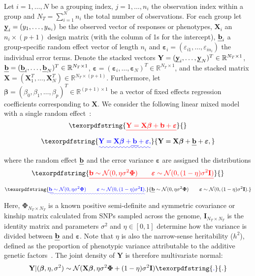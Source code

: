 \documentclass[10pt,letterpaper]{article}
\newcommand{\by}{\textbf{\emph{y}}}
\newcommand{\bX}{\textbf{X}}
\newcommand{\bY}{\textbf{Y}}
\newcommand{\bb}{\textbf{\emph{b}}}
\newcommand{\bI}{\textbf{I}}
\newcommand{\be}{\boldsymbol{\varepsilon}}
\newcommand{\bbeta}{\boldsymbol{\beta}}
\newcommand{\bPhi}{\boldsymbol{\Phi}}
\providecommand{\DIFaddtex}[1]{{\protect\color{blue}\uwave{#1}}} %
\providecommand{\DIFdeltex}[1]{{\protect\color{red}\sout{#1}}}                      %
\providecommand{\DIFaddbegin}{} %
\providecommand{\DIFaddend}{} %
\providecommand{\DIFdelbegin}{} %
\providecommand{\DIFdelend}{} %
\providecommand{\DIFadd}[1]{\texorpdfstring{\DIFaddtex{#1}}{#1}} %
\providecommand{\DIFdel}[1]{\texorpdfstring{\DIFdeltex{#1}}{}} %
\newcommand{\DIFscaledelfig}{0.5}
\newlength{\DIFdelgraphicswidth} %
\newlength{\DIFdelgraphicsheight} %
\newcommand{\DIFaddincludegraphics}[2][]{{\color{blue}\fbox{\DIFOincludegraphics[#1]{#2}}}} %
\newcommand{\DIFdelincludegraphics}[2][]{%
\sbox{\DIFdelgraphicsbox}{\DIFOincludegraphics[#1]{#2}}%
\settoboxwidth{\DIFdelgraphicswidth}{\DIFdelgraphicsbox} %
\settoboxtotalheight{\DIFdelgraphicsheight}{\DIFdelgraphicsbox} %
\scalebox{\DIFscaledelfig}{%
\parbox[b]{\DIFdelgraphicswidth}{\usebox{\DIFdelgraphicsbox}\\[-\baselineskip] \rule{\DIFdelgraphicswidth}{0em}}\llap{\resizebox{\DIFdelgraphicswidth}{\DIFdelgraphicsheight}{%
\setlength{\unitlength}{\DIFdelgraphicswidth}%
\begin{picture}(1,1)%
\thicklines\linethickness{2pt} %
{\color[rgb]{1,0,0}\put(0,0){\framebox(1,1){}}}%
{\color[rgb]{1,0,0}\put(0,0){\line( 1,1){1}}}%
{\color[rgb]{1,0,0}\put(0,1){\line(1,-1){1}}}%
\end{picture}%
}\hspace*{3pt}}} %
} %
\DeclareRobustCommand{\DIFaddbegin}{\DIFOaddbegin \let\includegraphics\DIFaddincludegraphics} %
\DeclareRobustCommand{\DIFaddend}{\DIFOaddend \let\includegraphics\DIFOincludegraphics} %
\DeclareRobustCommand{\DIFdelbegin}{\DIFOdelbegin \let\includegraphics\DIFdelincludegraphics} %
\DeclareRobustCommand{\DIFdelend}{\DIFOaddend \let\includegraphics\DIFOincludegraphics} %
\begin{document}
Let $i = 1, \ldots, N$ be a grouping index, $j = 1, \ldots, n_i$ the observation index within a group and $N_T = \sum_{i=1}^{N} n_i$ the total number of observations. For each group let \mbox{$\by_i = (y_1, \ldots, y_{n_i})$} be the observed vector of responses or phenotypes, $\bX_i$ an $n_i \times (p + 1)$ design matrix (with the column of 1s for the intercept), $\bb_i$ a group-specific random effect vector of length $n_i$ and \mbox{$\be_i = (\varepsilon_{i1}, \ldots, \varepsilon_{in_i})$} the individual error terms. Denote the stacked vectors $\bY = (\by_i, \ldots, \by_N)^T \in \mathbb{R}^{N_T \times 1}$, $\bb = (\bb_i, \ldots, \bb_N)^T \in \mathbb{R}^{N_T \times 1}$, \mbox{$\be = (\be_i, \ldots, \be_N)^T \in \mathbb{R}^{N_T \times 1}$}, and the stacked matrix \DIFdelbegin %
\DIFdelend \mbox{$\bX = (\bX_1^T, \ldots, \bX_N^T) \in \mathbb{R}^{N_T \times (p + 1)}$}. Furthermore, let $\bbeta = (\beta_0,\beta_1, \ldots, \beta_p)^T \in \mathbb{R}^{(p+1) \times 1}$ be a vector of fixed effects regression coefficients corresponding to $\bX$. We consider the following linear mixed model with a single random effect~\cite{pirinen2013efficient}:
\DIFdelbegin \begin{displaymath}
\DIFdel{\bY = \bX \bbeta + \bb + \be
}\end{displaymath}%
\DIFdelend \DIFaddbegin \begin{equation*}
\DIFadd{\bY = \bX \bbeta + \bb + \be,
}\end{equation*}\DIFaddend 
where the random effect $\bb$ and the error variance $\be$ are assigned the distributions
\DIFdelbegin \begin{displaymath}
\DIFdel{\bb \sim \mathcal{N}(0, \eta \sigma^2 \bPhi) \qquad \be \sim \mathcal{N}(0, (1-\eta)\sigma^2 \bI)
}\end{displaymath}%
\DIFdelend \DIFaddbegin \begin{equation*}
\DIFadd{\bb \sim \mathcal{N}(0, \eta \sigma^2 \bPhi) \qquad \be \sim \mathcal{N}(0, (1-\eta)\sigma^2 \bI).
}\end{equation*}\DIFaddend 
Here, $\bPhi_{N_T \times N_T}$ is a known positive semi-definite and symmetric covariance or kinship matrix calculated from SNPs sampled across the genome,   $\bI_{N_T \times N_T}$ is the identity matrix and parameters $\sigma^2$ and $\eta \in [0,1]$ determine how the variance is divided between $\bb$ and $\be$. Note that $\eta$ is also the narrow-sense heritability ($h^2$), defined as the proportion of phenotypic variance attributable to the additive genetic factors~\cite{manolio2009finding}. The joint density of $\bY$ is therefore multivariate normal:
\begin{equation}
\bY | (\bbeta, \eta, \sigma^2) \sim \mathcal{N}(\bX \bbeta, \eta \sigma^2 \bPhi + (1-\eta)\sigma^2 \bI) \label{eq:prinen}\DIFaddbegin \DIFadd{.
}\DIFaddend \end{equation}
\end{document}
